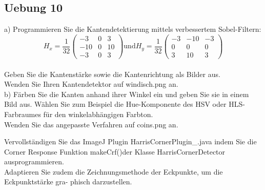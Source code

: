 \documentclass[10pt]{article}
\newcommand{\T}[1]{\text{#1}} %
\begin{document}
\subsection{Uebung 10}
a) Programmieren Sie die Kantendetektierung mittels verbessertem Sobel-Filtern:
\begin{equation*}
H_x = \frac{1}{32} \begin{pmatrix} -3 & 0 & 3\\-10& 0& 10\\ 	-3& 0& 3\end{pmatrix} \T{und} H_y=\frac{1}{32}\begin{pmatrix} -3&-10&-3 \\ 0&0&0 \\ 3&10&3  \end{pmatrix}
\end{equation*}\\
Geben Sie die Kantenstärke sowie die Kantenrichtung als Bilder aus.\\
Wenden Sie Ihren Kantendetektor auf windisch.png an.\\
b) Färben Sie die Kanten anhand ihrer Winkel ein und geben Sie sie in einem Bild aus.
Wählen Sie zum Beispiel die Hue-Komponente des HSV oder HLS-Farbraumes für den
winkelabhängigen Farbton.\\
Wenden Sie das angepasste Verfahren auf coins.png an.

Vervollständigen Sie das ImageJ Plugin HarrisCornerPlugin\_.java indem Sie die Corner
Response Funktion makeCrf()der Klasse HarrisCornerDetector ausprogrammieren.\\
Adaptieren Sie zudem die Zeichnungsmethode der Eckpunkte, um die Eckpunktstärke gra-
phisch darzustellen.


\end{document}
